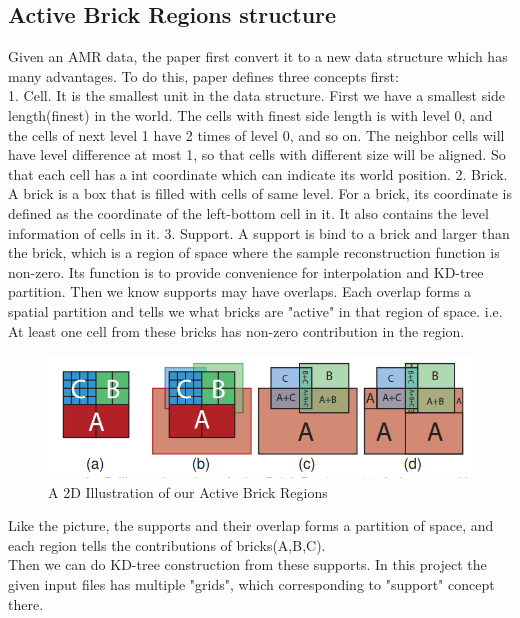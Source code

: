\documentclass[acmtog]{acmart}
\begin{document}
\subsection{Active Brick Regions structure}
Given an AMR data, the paper first convert it to a new data structure which has many advantages. To do this, paper defines three concepts first:\\
1. Cell. It is the smallest unit in the data structure. First we have a smallest side length(finest) in the world. The cells with finest side length is with level 0, and the cells of next level 1 have 2 times of level 0, and so on. The neighbor cells will have level difference at most 1, so that cells with different size will be aligned. So that each cell has a int coordinate which can indicate its world position. 
2. Brick. A brick is a box that is filled with cells of same level. For a brick, its coordinate is defined as the coordinate of the left-bottom cell in it. It also contains the level information of cells in it.
3. Support. A support is bind to a brick and larger than the brick, which is a region of space where the sample reconstruction function is non-zero. Its function is to provide convenience for interpolation and KD-tree partition.
Then we know supports may have overlaps. Each overlap forms a spatial partition and tells we what bricks are "active" in that region of space. i.e. At least one cell from these bricks has non-zero contribution in the region.
\begin{figure}[h]
	\centering	
	\includegraphics[width=0.7\linewidth]
	{images/ABR.png}
	\caption{A 2D Illustration of our Active Brick Regions}
\end{figure}

Like the picture, the supports and their overlap forms a partition of space, and each region tells the contributions of bricks(A,B,C).\\
Then we can do KD-tree construction from these supports. In this project the given input files has multiple "grids", which corresponding to "support" concept there.
\end{document}

